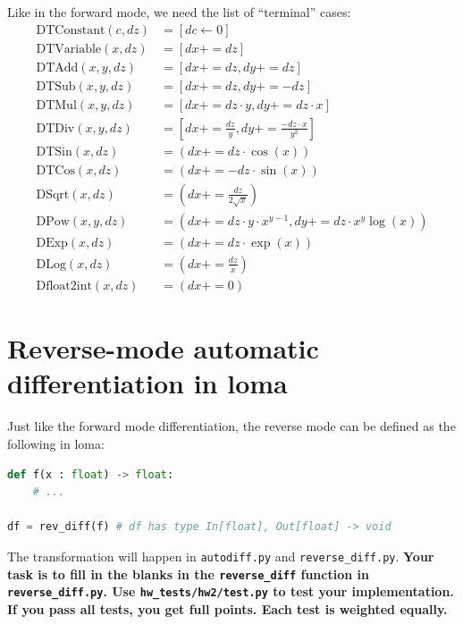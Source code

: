 Like in the forward mode, we need the list of ``terminal'' cases:
\begin{equation}
\begin{aligned}
\text{DTConstant}(c, dz) &= \left[dc \leftarrow 0\right] \\
\text{DTVariable}(x, dz) &= \left[dx += dz\right] \\
\text{DTAdd}(x, y, dz) &= \left[dx += dz, dy += dz\right] \\
\text{DTSub}(x, y, dz) &= \left[dx += dz, dy += -dz\right] \\
\text{DTMul}(x, y, dz) &= \left[dx += dz \cdot y, dy += dz \cdot x\right] \\
\text{DTDiv}(x, y, dz) &= \left[dx += \frac{dz}{y}, dy += \frac{-dz \cdot x}{y^2}\right] \\
\text{DTSin}(x, dz) &= \left(dx += dz \cdot \cos(x)\right) \\
\text{DTCos}(x, dz) &= \left(dx += -dz \cdot \sin(x)\right) \\
\text{DSqrt}(x, dz) &= \left(dx += \frac{dz}{2\sqrt{x}} \right) \\
\text{DPow}(x, y, dz) &= \left(dx += dz \cdot y \cdot x^{y-1}, dy += dz \cdot x^y \log(x) \right) \\
\text{DExp}(x, dz) &= \left(dx += dz \cdot \exp(x) \right) \\
\text{DLog}(x, dz) &= \left(dx += \frac{dz}{x} \right) \\
\text{Dfloat2int}(x, dz) &= \left(dx += 0\right)
\end{aligned}
\end{equation}

\section{Reverse-mode automatic differentiation in loma}

Just like the forward mode differentiation, the reverse mode can be defined as the following in loma:
\begin{lstlisting}[language=Python]
def f(x : float) -> float:
	# ...

df = rev_diff(f) # df has type In[float], Out[float] -> void
\end{lstlisting}

The transformation will happen in \lstinline{autodiff.py} and \lstinline{reverse_diff.py}. \textbf{Your task is to fill in the blanks in the \lstinline{reverse_diff} function in \lstinline{reverse_diff.py}. Use \lstinline{hw_tests/hw2/test.py} to test your implementation. If you pass all tests, you get full points. Each test is weighted equally.}

